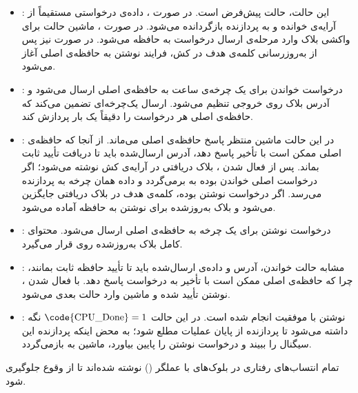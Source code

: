 \begin{itemize}
    \item \textbf{}: این حالت، حالت پیش‌فرض است. در صورت ، داده‌ی درخواستی مستقیماً از آرایه‌ی  خوانده و به پردازنده بازگردانده می‌شود. در صورت ، ماشین حالت برای واکشی بلاک وارد مرحله‌ی ارسال درخواست به حافظه می‌شود. در صورت  نیز پس از به‌روزرسانی کلمه‌ی هدف در کش، فرایند نوشتن به حافظه‌ی اصلی آغاز می‌شود.

    \item \textbf{}: درخواست خواندن برای یک چرخه‌ی ساعت به حافظه‌ی اصلی ارسال می‌شود و آدرس بلاک روی خروجی تنظیم می‌شود. ارسال یک‌چرخه‌ای تضمین می‌کند که حافظه‌ی اصلی هر درخواست را دقیقاً یک بار پردازش کند.

    \item \textbf{}: در این حالت ماشین منتظر پاسخ حافظه‌ی اصلی می‌ماند. از آنجا که حافظه‌ی اصلی ممکن است با تأخیر پاسخ دهد، آدرس ارسال‌شده باید تا دریافت تأیید ثابت بماند. پس از فعال شدن ، بلاک دریافتی در آرایه‌ی کش نوشته می‌شود؛ اگر درخواست اصلی خواندن بوده به  برمی‌گردد و داده همان چرخه به پردازنده می‌رسد. اگر درخواست نوشتن بوده، کلمه‌ی هدف در بلاک دریافتی جایگزین می‌شود و بلاک به‌روزشده برای نوشتن به حافظه آماده می‌شود.

    \item \textbf{}: درخواست نوشتن برای یک چرخه به حافظه‌ی اصلی ارسال می‌شود. محتوای کامل بلاک به‌روزشده روی  قرار می‌گیرد.

    \item \textbf{}: مشابه حالت خواندن، آدرس و داده‌ی ارسال‌شده باید تا تأیید حافظه ثابت بمانند، چرا که حافظه‌ی اصلی ممکن است با تأخیر به درخواست پاسخ دهد. با فعال شدن ، نوشتن تأیید شده و ماشین وارد حالت بعدی می‌شود.

    \item \textbf{}: نوشتن با موفقیت انجام شده است. در این حالت $\text{\code{CPU\_Done}}=1$ نگه داشته می‌شود تا پردازنده از پایان عملیات مطلع شود؛ به محض اینکه پردازنده این سیگنال را ببیند و درخواست نوشتن را پایین بیاورد، ماشین به  بازمی‌گردد.
\end{itemize}

تمام انتساب‌های رفتاری در بلوک‌های  با عملگر \code{<=} () نوشته شده‌اند تا از وقوع  جلوگیری شود.

